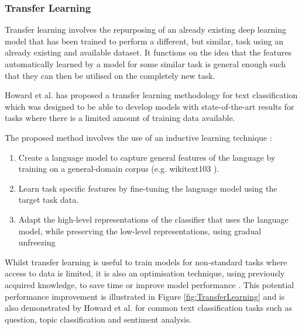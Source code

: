 \documentclass[a4paper,twoside,phd]{BYUPhys}
\begin{document}
\subsubsection{Transfer Learning}
\label{sec:TransferLearningReview}

Transfer learning involves the repurposing of an already existing deep learning model that has been trained to perform a different, but similar, task using an already existing and available dataset. It functions on the idea that the features automatically learned by a model for some similar task is general enough such that they can then be utilised on the completely new task. 

Howard et al. \cite{Howard2018} has proposed a transfer learning methodology for text classification which was designed to be able to develop models with state-of-the-art results for tasks where there is a limited amount of training data available. \newline

The proposed method involves the use of an inductive learning technique \cite{Pan2009}:
\begin{enumerate}
	\item Create a language model to capture general features of the language by training on a general-domain corpus (e.g. wikitext103 \cite{Merity2016}).
	\item Learn task specific features by fine-tuning the language model using the target task data.
	\item Adapt the high-level representations of the classifier that uses the language model, while preserving the low-level representations, using gradual unfreezing \cite{Howard2018}
\end{enumerate}

Whilst transfer learning is useful to train models for non-standard tasks where access to data is limited, it is also an optimisation technique, using previously acquired knowledge, to save time or improve model performance \cite{Pan2009}. This potential performance improvement is illustrated in Figure \ref{fig:TransferLearning} and is also demonstrated by Howard et al. \cite{Howard2018} for common text classification tasks such as question, topic  classification and sentiment analysis.
\end{document}

